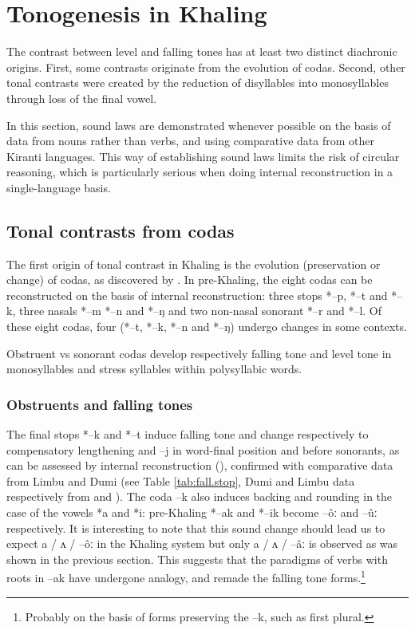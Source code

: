 \documentclass[oldfontcommands,oneside,a4paper,11pt]{article}
\newcommand{\ipa}[1]{{\phon \mbox{#1}}} %
\begin{document}
\section{Tonogenesis in Khaling}
The contrast between level and falling tones has at least two distinct diachronic origins. First, some contrasts originate from the evolution of codas. Second, other tonal contrasts were created by the reduction of disyllables into monosyllables through loss of the final vowel.

In this section, sound laws are demonstrated whenever possible on the basis of data from nouns rather than verbs, and  using comparative data from other Kiranti languages. This way of establishing sound laws limits the risk of circular reasoning, which is particularly serious when doing internal reconstruction in a single-language basis.

\subsection{Tonal contrasts from codas} \label{sec:coda.to.tone}
 The first origin of tonal contrast in Khaling is the evolution (preservation or change) of codas, as discovered by \citet{michailovsky75khaling}. In pre-Khaling, the eight codas can be reconstructed on the basis of internal reconstruction: three stops \ipa{*--p}, \ipa{*--t} and \ipa{*--k}, three nasals \ipa{*--m} \ipa{*--n} and \ipa{*--ŋ} and two non-nasal sonorant \ipa{*--r} and \ipa{*--l}. Of these eight codas, four (\ipa{*--t}, \ipa{*--k}, \ipa{*--n} and \ipa{*--ŋ}) undergo changes in some contexts. 

Obstruent vs sonorant codas develop respectively falling tone and level tone in monosyllables and stress syllables within polysyllabic words.

\subsubsection{Obstruents and falling tones} \label{sec:obstruents}
The final stops \ipa{*--k} and \ipa{*--t} induce falling tone and change respectively to compensatory lengthening and \ipa{--j} in word-final position and before sonorants, as can be assessed by internal reconstruction (\citealt{jacques12khaling}), confirmed with comparative data from Limbu and Dumi (see Table \ref{tab:fall.stop}, Dumi and Limbu data respectively from \citealt{driem93dumi} and \citealt{michailovsky02dico}). The coda \ipa{--k} also induces backing and rounding in the case of the vowels \ipa{*a} and \ipa{*i}: pre-Khaling \ipa{*--ak} and \ipa{*--ik} become \ipa{--ôː} and \ipa{--ûː} respectively. It is interesting to note that this sound change should lead us to expect \ipa{a} / \ipa{ʌ} / \ipa{--ôː} in the Khaling system but only \ipa{a} / \ipa{ʌ} / \ipa{--âː} is observed as was shown in the previous section. This suggests that the paradigms of verbs with roots in \ipa{--ak} have undergone analogy, and remade the falling tone forms.\footnote{Probably on the basis of forms preserving the \ipa{--k}, such as   first plural.}
\end{document}
